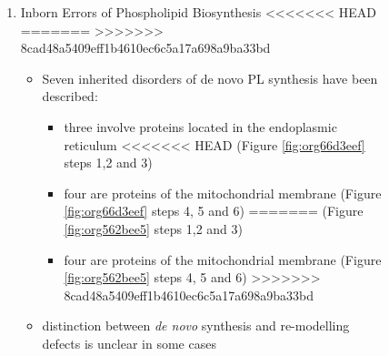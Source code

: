 \documentclass{scrartcl}
\begin{document}
\begin{itemize}
\begin{enumerate}
\begin{enumerate}
\begin{enumerate}
\begin{itemize}
\begin{enumerate}
\begin{enumerate}
\begin{figure}[htbp]
{\begin{enumerate}
\item Inborn Errors of Phospholipid Biosynthesis
<<<<<<< HEAD
\label{sec:org35618a3}
=======
\label{sec:org031046d}
>>>>>>> 8cad48a5409eff1b4610ec6c5a17a698a9ba33bd
\begin{itemize}
\item Seven inherited disorders of de novo PL synthesis have been described:
\begin{itemize}
\item three involve proteins located in the endoplasmic reticulum
<<<<<<< HEAD
(Figure \ref{fig:org66d3eef} steps 1,2 and 3)
\item four are proteins of the mitochondrial membrane (Figure
\ref{fig:org66d3eef} steps 4, 5 and 6)
=======
(Figure \ref{fig:org562bee5} steps 1,2 and 3)
\item four are proteins of the mitochondrial membrane (Figure
\ref{fig:org562bee5} steps 4, 5 and 6)
>>>>>>> 8cad48a5409eff1b4610ec6c5a17a698a9ba33bd
\end{itemize}
\item distinction between \emph{de novo} synthesis and re-modelling defects is
unclear in some cases
\end{itemize}


\end{enumerate}}
\end{figure}
\end{enumerate}
\end{enumerate}
\end{itemize}
\end{enumerate}
\end{enumerate}
\end{enumerate}
\end{itemize}
\end{document}
